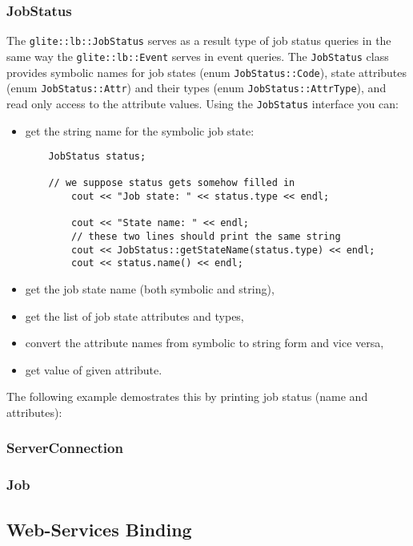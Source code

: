 \subsubsection{JobStatus}
The \verb'glite::lb::JobStatus' serves as a result type of job status
queries in the same way the \verb'glite::lb::Event' serves in event
queries. The \verb'JobStatus' class provides symbolic names for job
states (enum \verb'JobStatus::Code'), state attributes
(enum \verb'JobStatus::Attr') and their types (enum
\verb'JobStatus::AttrType'), and read only access to the
attribute values. Using the \verb'JobStatus' interface you can:
\begin{itemize}
\item get the string name for the symbolic job state:
\begin{lstlisting}
	JobStatus status;

	// we suppose status gets somehow filled in
        cout << "Job state: " << status.type << endl;

        cout << "State name: " << endl;
        // these two lines should print the same string
        cout << JobStatus::getStateName(status.type) << endl;
        cout << status.name() << endl;
\end{lstlisting}
\item get the job state name (both symbolic and string),
\item get the list of job state attributes and types,	
\item convert the attribute names from symbolic to string form and
vice versa,
\item get value of given attribute.
\end{itemize}
The following example demostrates this by printing job status (name
and attributes):


\subsubsection{ServerConnection}\label{s:ServerConnection}

\subsubsection{Job}


\subsection{Web-Services Binding}\label{s:Consumer-API-WS}

